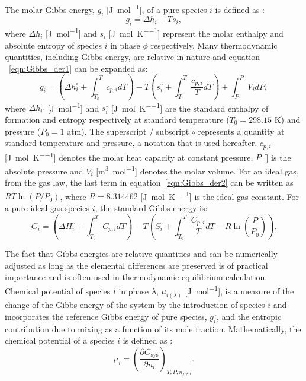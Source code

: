     The molar Gibbs energy, $g_{i}$ [\si{\joule \per \mole}], of a pure species  $i$ is defined as \cite{Zemansky81}:
\begin{equation} \label{eqn:Gibbs_der1}
        g_{i} = \Delta h_{i} - Ts_{i},
\end{equation}
    where $\Delta h_{i}$ [\si{\joule \per \mole}] and $s_{i}$ [\si{\joule \per \mole \per \kelvin}] represent the molar enthalpy and absolute entropy of species $i$ in phase $\phi$ respectively. Many thermodynamic quantities, including Gibbs energy, are relative in nature and equation ~\eqref{eqn:Gibbs_der1} can be expanded as:
\begin{equation} \label{eqn:Gibbs_der2}
        g_{i} = \left(\Delta h_{i}^\circ + \int_{T_0}^{T} c_{p,i}dT \right) - T\left( s_{i}^\circ  + \int_{T_0}^{T} \frac{c_{p,i}}{T}dT \right) + \int_{P_0}^{P} V_i dP,
\end{equation}
where $\Delta h_{i^\circ}$ [\si{\joule \per \mole}] and $s_{i}^{\circ}$ [\si{\joule \per \mole \per \kelvin}] are the standard enthalpy of formation and entropy respectively at standard temperature ($T_0 = 298.15$ \si{\kelvin}) and pressure ($P_0 = 1$ \si{atm}). The superscript / subscript $\circ$ represents a quantity at standard temperature and pressure, a notation that is used hereafter. $c_{p,i}$ [\si{\joule \per \mole \per \kelvin}]  denotes the molar heat capacity at constant pressure, $P$ [\si{\atmosphere}] is the absolute pressure and $V_i$ [\si{\meter \cubed \per \mole}] denotes the molar volume. For an ideal gas, from the gas law, the last term in equation~\eqref{eqn:Gibbs_der2} can be written as $RT \ln{\left(P/P_0\right)}$, where $R = 8.314462$ [\si{\joule \per \mole \per \kelvin}] is the ideal gas constant. For a pure ideal gas species $i$, the standard Gibbs energy is:
\begin{equation} \label{eqn:Gibbs_der_id}
        G_{i} = \left(\Delta H_{i}^\circ + \int_{T_0}^{T} C_{p,i}dT \right) - T\left( S_{i}^\circ  + \int_{T_0}^{T} \frac{C_{p,i}}{T}dT  - R \ln{\left(\frac{P}{P_0}\right)}\right).
\end{equation}

The fact that Gibbs energies are relative quantities and can be numerically adjusted as long as the elemental differences are preserved is of practical importance and is often used in thermodynamic equilibrium calculation. Chemical potential of species $i$ in phase $\lambda$, $\mu_{i(\lambda)}$ [\si{\joule \per \mole}], is a measure of the change of the Gibbs energy of the system by the introduction of species $i$ and incorporates  the reference Gibbs energy of pure species, $g_{i}^\circ$, and the entropic contribution due to mixing as a function of its mole fraction. Mathematically, the chemical potential of a species $i$ is defined as \cite{Zemansky81}:
    \begin{equation}\label{eq:mu_def}
            \mu_{i} = {\left (\frac{\partial G_\text{sys}}{\partial n_{i}} \right )}_{T,P,n_{j \neq i}}.
    \end{equation}

